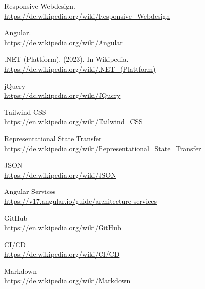 \documentclass[a4paper,11pt]{article}
\begin{document}
\begin{thebibliography}{99}
   Responsive Webdesign. \\
  \url{https://de.wikipedia.org/wiki/Responsive_Webdesign}
  
   Angular.\\
  \url{https://de.wikipedia.org/wiki/Angular}
  
   .NET (Plattform). (2023). In Wikipedia. \\
  \url{https://de.wikipedia.org/wiki/.NET_(Plattform)}
  
   jQuery \\
  \url{https://de.wikipedia.org/wiki/JQuery}
  
   Tailwind CSS \\
  \url{https://en.wikipedia.org/wiki/Tailwind_CSS}
  
   Representational State Transfer \\
  \url{https://de.wikipedia.org/wiki/Representational_State_Transfer}
  
   JSON\\
  \url{https://de.wikipedia.org/wiki/JSON}
  
   Angular Services \\
  \url{https://v17.angular.io/guide/architecture-services}
  
   GitHub \\
  \url{https://en.wikipedia.org/wiki/GitHub}
  
   CI/CD \\
  \url{https://de.wikipedia.org/wiki/CI/CD}
  
   Markdown \\
  \url{https://de.wikipedia.org/wiki/Markdown}
\end{thebibliography}
\end{document}
